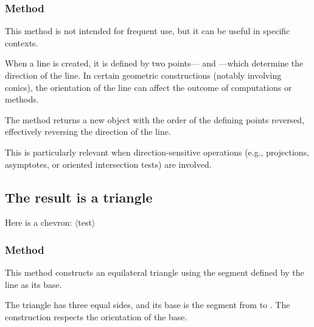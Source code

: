 \subsubsection{Method }
\label{ssub:method_line_swap__line}

This method is not intended for frequent use, but it can be useful in specific contexts.

\medskip
\noindent
When a line is created, it is defined by two points— and —which determine the direction of the line. In certain geometric constructions (notably involving conics), the orientation of the line can affect the outcome of computations or methods.

\medskip
\noindent
The  method returns a new  object with the order of the defining points reversed, effectively reversing the direction of the line.

\medskip
\noindent
This is particularly relevant when direction-sensitive operations (e.g., projections, asymptotes, or oriented intersection tests) are involved.

\vspace{1em}
\begin{tkzexample}[latex=7cm]
\end{tkzexample}

\subsection{The result is a triangle}

Here is a chevron: $\langle$test$\rangle$


\subsubsection{Method }
\label{ssub:method_line_equilateral}

This method constructs an equilateral triangle using the segment defined by the line as its base.

\medskip
\noindent
The triangle has three equal sides, and its base is the segment from  to . The construction respects the orientation of the base.

